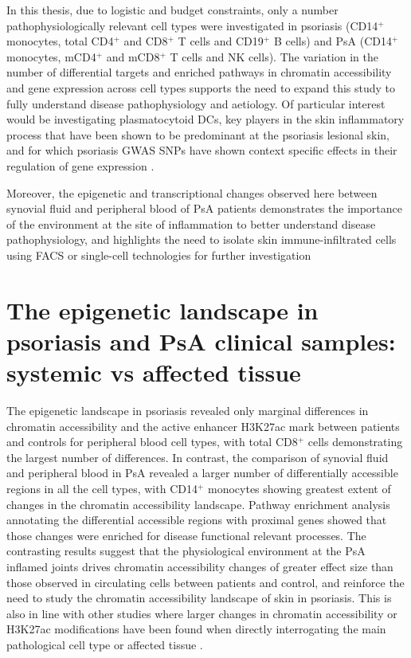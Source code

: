 In this thesis, due to logistic and budget constraints, only a number pathophysiologically relevant cell types were investigated in psoriasis (CD14$^+$ monocytes, total CD4$^+$ and CD8$^+$ T cells and CD19$^+$ B cells) and PsA (CD14$^+$ monocytes, mCD4$^+$ and mCD8$^+$ T cells and NK cells). The variation in the number of differential targets and enriched pathways in chromatin accessibility and gene expression across cell types supports the need to expand this study to fully understand disease pathophysiology and aetiology. Of particular interest would be investigating plasmatocytoid DCs, key players in the skin inflammatory process that have been shown to be predominant at the psoriasis lesional skin, and for which psoriasis GWAS SNPs have shown context specific effects in their regulation of gene expression \parencite{Lee2014,Cheng2018}. 

Moreover, the epigenetic and transcriptional changes observed here between synovial fluid and peripheral blood of PsA patients demonstrates the importance of the environment at the site of inflammation to better understand disease pathophysiology, and highlights the need to isolate skin immune-infiltrated cells using FACS or single-cell technologies for further investigation \parencite{Ahn2017}





\section{The epigenetic landscape in psoriasis and PsA clinical samples: systemic vs affected tissue}
The epigenetic landscape in psoriasis revealed only marginal differences in chromatin accessibility and the active enhancer H3K27ac mark between patients and controls for peripheral blood cell types, with total CD8$^+$ cells demonstrating the largest number of differences. In contrast, the comparison of synovial fluid and peripheral blood in PsA revealed a larger number of differentially accessible regions in all the cell types, with CD14$^+$ monocytes showing greatest extent of changes in the chromatin accessibility landscape. Pathway enrichment analysis annotating the differential accessible regions with proximal genes showed that those changes were enriched for disease functional relevant processes. The contrasting results suggest that the physiological environment at the PsA inflamed joints drives chromatin accessibility changes of greater effect size than those observed in circulating cells between patients and control, and reinforce the need to study the chromatin accessibility landscape of skin in psoriasis. This is also in line with other studies where larger changes in chromatin accessibility or H3K27ac modifications have been found when directly interrogating the main pathological cell type or affected tissue \parencite{Scharer2016,Peeters2015,Wang2018,Liu2018}. 

